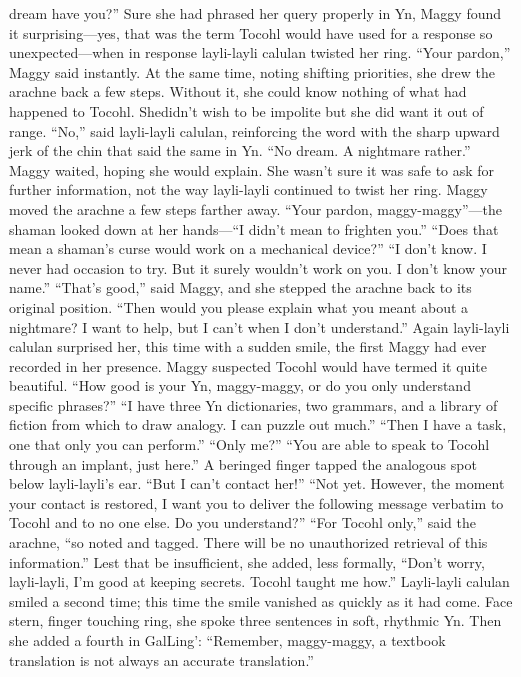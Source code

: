 \documentclass[9pt]{article}
\begin{document}
dream have you?”
Sure she had phrased her query properly in Yn, Maggy found it surprising—yes, that was the term
Tocohl would have used for a response so unexpected—when in response layli-layli calulan twisted
her ring.
“Your pardon,” Maggy said instantly. At the same time, noting shifting priorities, she drew the
arachne back a few steps. Without it, she could know nothing of what had happened to Tocohl. Shedidn’t wish to be impolite but she did want it out of range.
“No,” said layli-layli calulan, reinforcing the word with the sharp upward jerk of the chin that said
the same in Yn. “No dream. A nightmare rather.”
Maggy waited, hoping she would explain. She wasn’t sure it was safe to ask for further information,
not the way layli-layli continued to twist her ring. Maggy moved the arachne a few steps farther away.
“Your pardon, maggy-maggy”—the shaman looked down at her hands—“I didn’t mean to frighten
you.”
“Does that mean a shaman’s curse would work on a mechanical device?”
“I don’t know. I never had occasion to try. But it surely wouldn’t work on you. I don’t know your
name.”
“That’s good,” said Maggy, and she stepped the arachne back to its original position. “Then would
you please explain what you meant about a nightmare? I want to help, but I can’t when I don’t
understand.”
Again layli-layli calulan surprised her, this time with a sudden smile, the first Maggy had ever
recorded in her presence. Maggy suspected Tocohl would have termed it quite beautiful.
“How good is your Yn, maggy-maggy, or do you only understand specific phrases?”
“I have three Yn dictionaries, two grammars, and a library of fiction from which to draw analogy. I
can puzzle out much.”
“Then I have a task, one that only you can perform.”
“Only me?”
“You are able to speak to Tocohl through an implant, just here.” A beringed finger tapped the
analogous spot below layli-layli’s ear.
“But I can’t contact her!”
“Not yet. However, the moment your contact is restored, I want you to deliver the following message
verbatim to Tocohl and to no one else. Do you understand?”
“For Tocohl only,” said the arachne, “so noted and tagged. There will be no unauthorized retrieval of
this information.” Lest that be insufficient, she added, less formally, “Don’t worry, layli-layli, I’m good at
keeping secrets. Tocohl taught me how.”
Layli-layli calulan smiled a second time; this time the smile vanished as quickly as it had come. Face
stern, finger touching ring, she spoke three sentences in soft, rhythmic Yn. Then she added a fourth in
GalLing’: “Remember, maggy-maggy, a textbook translation is not always an accurate translation.”
\end{document}
